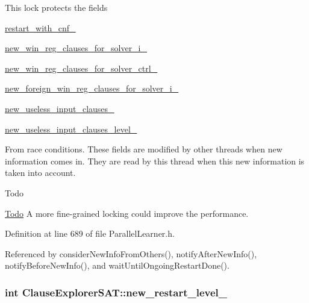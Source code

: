 This lock protects the fields 
\begin{DoxyItemize}
\item \hyperlink{classClauseExplorerSAT_a1a9dc7f76967c8164e9625df34dec172}{restart\-\_\-with\-\_\-cnf\-\_\-} 
\item \hyperlink{classClauseExplorerSAT_a2c3e73b4c0529b9139354a965d34e81f}{new\-\_\-win\-\_\-reg\-\_\-clauses\-\_\-for\-\_\-solver\-\_\-i\-\_\-} 
\item \hyperlink{classClauseExplorerSAT_a7d923928f3cb6209b29f5cc5104b5fe2}{new\-\_\-win\-\_\-reg\-\_\-clauses\-\_\-for\-\_\-solver\-\_\-ctrl\-\_\-} 
\item \hyperlink{classClauseExplorerSAT_a70c8edd590d75994ee354d591909cd35}{new\-\_\-foreign\-\_\-win\-\_\-reg\-\_\-clauses\-\_\-for\-\_\-solver\-\_\-i\-\_\-} 
\item \hyperlink{classClauseExplorerSAT_a3d1bdb9a6484c85af655a4eed1ee5f19}{new\-\_\-useless\-\_\-input\-\_\-clauses\-\_\-} 
\item \hyperlink{classClauseExplorerSAT_a67eeafbba9da9c87534f7ef26531a57a}{new\-\_\-useless\-\_\-input\-\_\-clauses\-\_\-level\-\_\-} 
\end{DoxyItemize}From race conditions. These fields are modified by other threads when new information comes in. They are read by this thread when this new information is taken into account.

\begin{DoxyRefDesc}{Todo}
\item[\hyperlink{todo__todo000007}{Todo}]A more fine-\/grained locking could improve the performance. \end{DoxyRefDesc}


Definition at line 689 of file Parallel\-Learner.\-h.



Referenced by consider\-New\-Info\-From\-Others(), notify\-After\-New\-Info(), notify\-Before\-New\-Info(), and wait\-Until\-Ongoing\-Restart\-Done().

\hypertarget{classClauseExplorerSAT_adf9bfe4390d34e57e25f269afa1e7b25}{
\subsubsection[{new\-\_\-restart\-\_\-level\-\_\-}]{\setlength{\rightskip}{0pt plus 5cm}int Clause\-Explorer\-S\-A\-T\-::new\-\_\-restart\-\_\-level\-\_\-\hspace{0.3cm}{\ttfamily [protected]}}}\label{classClauseExplorerSAT_adf9bfe4390d34e57e25f269afa1e7b25}


